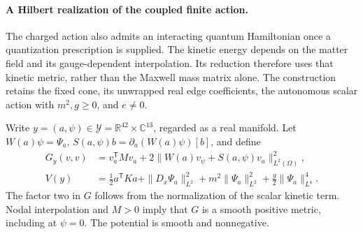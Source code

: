 \paragraph{A Hilbert realization of the coupled finite action.}
The charged action also admits an interacting quantum Hamiltonian once a
quantization prescription is supplied. The kinetic energy depends on the
matter field and its gauge-dependent interpolation. Its reduction therefore
uses that kinetic metric, rather than the Maxwell mass matrix alone.
The construction retains the fixed cone, its unwrapped real edge
coefficients, the autonomous scalar action with \(m^2,g\geq0\), and
\(e\ne0\).

Write \(y=(a,\psi)\in\mathcal Y=\mathbb R^{42}\times
\mathbb C^{13}\), regarded as a real manifold. Let
\(W(a)\psi=\Psi_a\), \(S(a,\psi)b=\partial_a(W(a)\psi)[b]\),
and define
\begin{align}
 G_y(v,v)&=v_a^{\mathsf T}Mv_a+
              2\|W(a)v_\psi+S(a,\psi)v_a\|_{L^2(\Omega)}^2,
 \label{eq:whitney-interacting-metric}\\
 V(y)&=\frac12a^{\mathsf T}Ka+
 \|D_x\Psi_a\|_{L^2}^2+m^2\|\Psi_a\|_{L^2}^2
                         +\frac g2\|\Psi_a\|_{L^4}^4.
 \label{eq:whitney-interacting-potential}
\end{align}
The factor two in \(G\) follows from the normalization of the scalar
kinetic term. Nodal interpolation and \(M>0\) imply that \(G\)
is a smooth positive metric, including at \(\psi=0\).
The potential is smooth and nonnegative.

